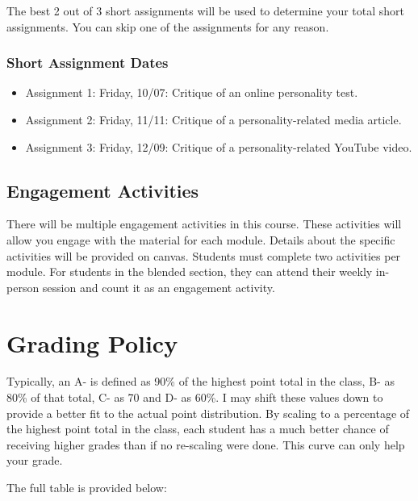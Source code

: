 \documentclass[
]{book}
\begin{document}
The best 2 out of 3 short assignments will be used to determine your total short assignments. You can skip one of the assignments for any reason.

\subsubsection*{Short Assignment Dates}\label{short-assignment-dates}


\begin{itemize}
\item
  Assignment 1: Friday, 10/07: Critique of an online personality test.
\item
  Assignment 2: Friday, 11/11: Critique of a personality-related media article.
\item
  Assignment 3: Friday, 12/09: Critique of a personality-related YouTube video.
\end{itemize}

\subsection*{Engagement Activities}\label{engagement-activities-1}


There will be multiple engagement activities in this course. These activities will allow you engage with the material for each module. Details about the specific activities will be provided on canvas. Students must complete two activities per module. For students in the blended section, they can attend their weekly in-person session and count it as an engagement activity.

\section*{Grading Policy}\label{grading-policy-1}


Typically, an A- is defined as 90\% of the highest point total in the class, B- as 80\% of that total, C- as 70 and D- as 60\%.
I may shift these values down to provide a better fit to the actual point distribution.
By scaling to a percentage of the highest point total in the class, each student has a much better chance of receiving higher grades than if no re-scaling were done.
This curve can only help your grade.

The full table is provided below:
\end{document}

